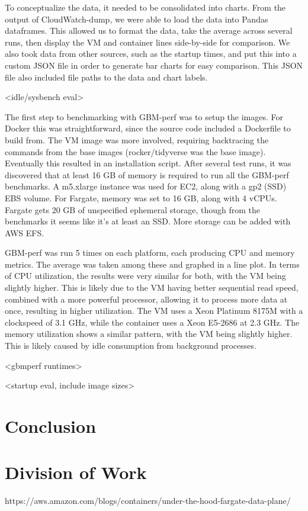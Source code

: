 \documentclass[11pt]{article}
\begin{document}
To conceptualize the data, it needed to be consolidated into charts. From the output of CloudWatch-dump, we were able to load the data into Pandas dataframes. This allowed us to format the data, take the average across several runs, then display the VM and container lines side-by-side for comparison. We also took data from other sources, such as the startup times, and put this into a custom JSON file in order to generate bar charts for easy comparison. This JSON file also included file paths to the data and chart labels.

<idle/sysbench eval>

The first step to benchmarking with GBM-perf was to setup the images. For Docker this was straightforward, since the source code included a Dockerfile to build from. The VM image was more involved, requiring backtracing the commands from the base images (rocker/tidyverse was the base image). Eventually this resulted in an installation script. After several test runs, it was discovered that at least 16 GB of memory is required to run all the GBM-perf benchmarks. A m5.xlarge instance was used for EC2, along with a gp2 (SSD) EBS volume. For Fargate, memory was set to 16 GB, along with 4 vCPUs. Fargate gets 20 GB of unspecified ephemeral storage, though from the benchmarks it seems like it's at least an SSD. More storage can be added with AWS EFS.

GBM-perf was run 5 times on each platform, each producing CPU and memory metrics. The average was taken among these and graphed in a line plot. In terms of CPU utilization, the results were very similar for both, with the VM being slightly higher. This is likely due to the VM having better sequential read speed, combined with a more powerful processor, allowing it to process more data at once, resulting in higher utilization. The VM uses a Xeon Platinum 8175M with a clockspeed of 3.1 GHz, while the container uses a Xeon E5-2686 at 2.3 GHz. The memory utilization shows a similar pattern, with the VM being slightly higher. This is likely caused by idle consumption from background processes.

<gbmperf runtimes>

<startup eval, include image sizes>


\section{Conclusion}


\section{Division of Work}



https://aws.amazon.com/blogs/containers/under-the-hood-fargate-data-plane/
\end{document}
